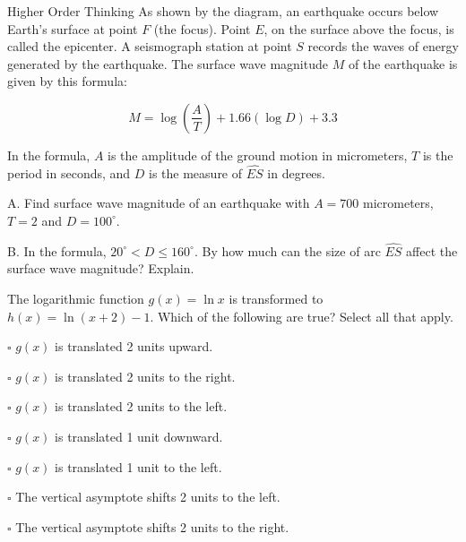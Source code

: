 \documentclass{article}
\newenvironment{practice}[2]{}{}        %
\newcommand{\answer}[1]{}               %
\newcommand{\placeholder}[2]{}          %
\begin{document}
\begin{practice}{30}{1}
Higher Order Thinking As shown by the diagram, an earthquake occurs below Earth's surface at point $F$ (the focus). Point $E$, on the surface above the focus, is called the epicenter. A seismograph station at point $S$ records the waves of energy generated by the earthquake. The surface wave magnitude $M$ of the earthquake is given by this formula:

\[
M=\log\left(\frac{A}{T}\right)+1.66(\log D)+3.3
\]

In the formula, $A$ is the amplitude of the ground motion in micrometers, $T$ is the period in seconds, and $D$ is the measure of $\widehat{ES}$ in degrees.

\placeholder{illustration}{Cutaway diagram of Earth's surface with focus F below the surface, epicenter E above the focus, seismograph station S on the surface, arc ES, and waves radiating from the focus.}

A. Find surface wave magnitude of an earthquake with $A=700$ micrometers, $T=2$ and $D=100^\circ$.

B. In the formula, $20^\circ<D\le160^\circ$. By how much can the size of arc $\widehat{ES}$ affect the surface wave magnitude? Explain.

\answer{A. magnitude 9.2.

B. The size of the arc can add between 2.2 and 3.7 to the surface wave magnitude, meaning the arc size can affect the surface wave magnitude by up to 1.5.}
\end{practice}

\begin{practice}{31}{2}
The logarithmic function $g(x)=\ln x$ is transformed to $h(x)=\ln(x+2)-1$. Which of the following are true? Select all that apply.

$\square$ $g(x)$ is translated 2 units upward.

$\square$ $g(x)$ is translated 2 units to the right.

$\square$ $g(x)$ is translated 2 units to the left.

$\square$ $g(x)$ is translated 1 unit downward.

$\square$ $g(x)$ is translated 1 unit to the left.

$\square$ The vertical asymptote shifts 2 units to the left.

$\square$ The vertical asymptote shifts 2 units to the right.

\answer{$g(x)$ is translated 2 units to the left; $g(x)$ is translated 1 unit downward; The vertical asymptote shifts 2 units to the left.}
\end{practice}
\end{document}
